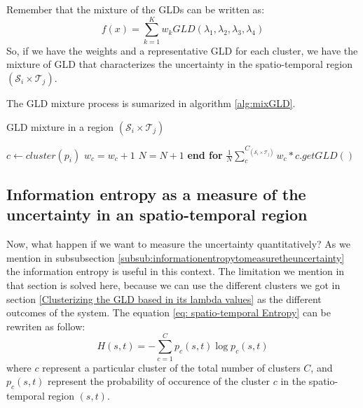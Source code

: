 Remember that the mixture of the GLDs can be written as:
\begin{equation}
f(x)=\sum_{k=1}^K w_{k}GLD(\lambda_{1},\lambda_{2},\lambda_{3},\lambda_{4})
\end{equation}
So, if we have the weights and a representative GLD for each cluster, we have the mixture of GLD that characterizes the uncertainty in the spatio-temporal region $(\mathcal{S}_{i} \times \mathcal{T}_{j})$.

The GLD mixture process is sumarized in algorithm \ref{alg:mixGLD}.

\begin{algorithm} 
\caption{GLD mixture in a region $(\mathcal{S}_{i} \times \mathcal{T}_{j})$}\label{alg:mixGLD}
\begin{algorithmic}[1] 
\State $c \gets cluster(p_i)$
\State $w_c= w_c+1$
\State $N=N+1$
\EndFor
\State \textbf{end for}
\State \Return $\frac{1}{N} \sum_{c}^{C_{(\mathcal{S}_{i} \times \mathcal{T}_{j})}} 
    w_{c} * c.getGLD()$
\EndFunction 
\end{algorithmic} 
\end{algorithm} 

\subsection{Information entropy as a measure of the uncertainty in an spatio-temporal region}
\label{sub:InfomationEntropyRegionWorkflow}
Now, what happen if we want to measure the uncertainty quantitatively? As we mention in subsubsection \ref{subsub:informationentropytomeasuretheuncertainty} the information entropy is useful in this context. The limitation we mention in that section is solved here, because we can use the different clusters we got in section \ref{Clusterizing the GLD based in its lambda values} as the different outcomes of the system. 
The equation \ref{eq: spatio-temporal Entropy} can be rewriten as follow:
\begin{equation}\label{eq: spatio-temporal EntropyWorkflow}
H(s,t)=-\sum_{c=1}^C p_{c}(s,t)\log p_{c}(s,t)
\end{equation}
where $c$ represent a particular cluster of the total number of clusters $C$, and $p_{c}(s,t)$ represent the probability of occurence of the cluster $c$ in the spatio-temporal region $(s,t)$.

